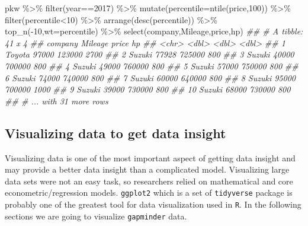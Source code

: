 \documentclass[
  letterpaper,
  DIV=11,
  numbers=noendperiod]{scrartcl}
\newenvironment{Shaded}{\begin{snugshade}}{\end{snugshade}}
\newcommand{\AttributeTok}[1]{\textcolor[rgb]{0.40,0.45,0.13}{#1}}
\newcommand{\DecValTok}[1]{\textcolor[rgb]{0.68,0.00,0.00}{#1}}
\newcommand{\DocumentationTok}[1]{\textcolor[rgb]{0.37,0.37,0.37}{\textit{#1}}}
\newcommand{\FunctionTok}[1]{\textcolor[rgb]{0.28,0.35,0.67}{#1}}
\newcommand{\NormalTok}[1]{\textcolor[rgb]{0.00,0.23,0.31}{#1}}
\newcommand{\SpecialCharTok}[1]{\textcolor[rgb]{0.37,0.37,0.37}{#1}}
\begin{document}
\begin{Shaded}
\begin{Highlighting}[]
\NormalTok{pkw }\SpecialCharTok{\%\textgreater{}\%} \FunctionTok{filter}\NormalTok{(year}\SpecialCharTok{==}\DecValTok{2017}\NormalTok{) }\SpecialCharTok{\%\textgreater{}\%} 
  \FunctionTok{mutate}\NormalTok{(}\AttributeTok{percentile=}\FunctionTok{ntile}\NormalTok{(price,}\DecValTok{100}\NormalTok{)) }\SpecialCharTok{\%\textgreater{}\%} 
  \FunctionTok{filter}\NormalTok{(percentile}\SpecialCharTok{\textless{}}\DecValTok{10}\NormalTok{) }\SpecialCharTok{\%\textgreater{}\%} 
  \FunctionTok{arrange}\NormalTok{(}\FunctionTok{desc}\NormalTok{(percentile)) }\SpecialCharTok{\%\textgreater{}\%} 
  \FunctionTok{top\_n}\NormalTok{(}\SpecialCharTok{{-}}\DecValTok{10}\NormalTok{,}\AttributeTok{wt=}\NormalTok{percentile) }\SpecialCharTok{\%\textgreater{}\%} 
  \FunctionTok{select}\NormalTok{(company,Mileage,price,hp)}
\DocumentationTok{\#\# \# A tibble: 41 x 4}
\DocumentationTok{\#\#    company Mileage  price    hp}
\DocumentationTok{\#\#    \textless{}chr\textgreater{}     \textless{}dbl\textgreater{}  \textless{}dbl\textgreater{} \textless{}dbl\textgreater{}}
\DocumentationTok{\#\#  1 Toyota    97000 123000  2700}
\DocumentationTok{\#\#  2 Suzuki    77928 725000   800}
\DocumentationTok{\#\#  3 Suzuki    40000 700000   800}
\DocumentationTok{\#\#  4 Suzuki    49000 760000   800}
\DocumentationTok{\#\#  5 Suzuki    57000 750000   800}
\DocumentationTok{\#\#  6 Suzuki    74000 740000   800}
\DocumentationTok{\#\#  7 Suzuki    60000 640000   800}
\DocumentationTok{\#\#  8 Suzuki    95000 700000  1000}
\DocumentationTok{\#\#  9 Suzuki    39000 730000   800}
\DocumentationTok{\#\# 10 Suzuki    68000 730000   800}
\DocumentationTok{\#\# \# ... with 31 more rows}
\end{Highlighting}
\end{Shaded}

\hypertarget{visualizing-data-to-get-data-insight}{%
\subsection{Visualizing data to get data
insight}\label{visualizing-data-to-get-data-insight}}

Visualizing data is one of the most important aspect of getting data
insight and may provide a better data insight than a complicated model.
Visualizing large data sets were not an easy task, so researchers relied
on mathematical and core econometric/regression models. \texttt{ggplot2}
which is a set of \texttt{tidyverse} package is probably one of the
greatest tool for data visualization used in \texttt{R}. In the
following sections we are going to visualize \texttt{gapminder} data.
\end{document}
